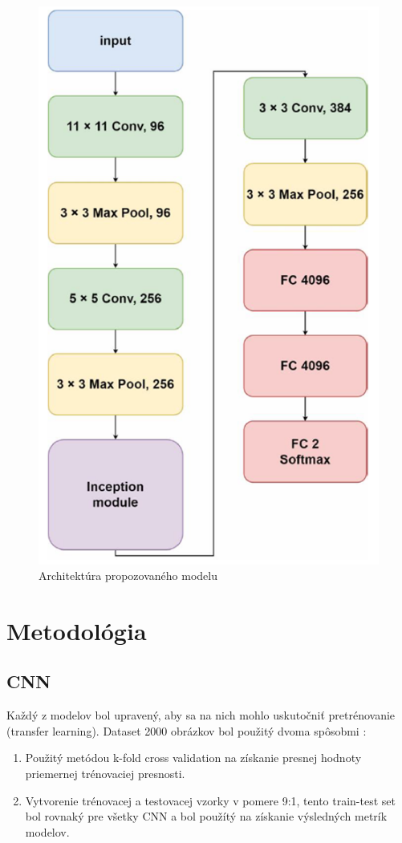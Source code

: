\documentclass[journal,onecolumn]{IEEEtran}
\begin{document}
\begin{figure}[!htb]
    \centering
    \includegraphics[width=0.45\linewidth]{Images/arch_proposed.png}
    \caption{Architektúra propozovaného modelu \cite{pc}}
    \label{fig:enter-label}
\end{figure}

\newpage
\section{Metodológia}
\subsection{CNN}
Každý z modelov bol upravený, aby sa na nich mohlo uskutočniť pretrénovanie (transfer learning). Dataset 2000 obrázkov bol použitý dvoma spôsobmi :
\begin{enumerate}[label=\Alph*]
  \item Použitý metódou k-fold cross validation na získanie presnej hodnoty priemernej trénovaciej presnosti. 
  \item Vytvorenie trénovacej a testovacej vzorky v pomere 9:1, tento train-test set bol rovnaký pre všetky CNN a bol použítý na získanie výsledných metrík modelov.
\end{enumerate}
\vspace{10pt}
\end{document}
